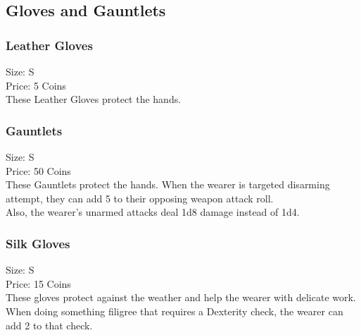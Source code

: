 \subsection{Gloves and Gauntlets}\label{subsec:gloves}

\subsubsection{Leather Gloves}\label{item:leathergloves}
Size: S\\
Price: 5 Coins\\
These Leather Gloves protect the hands.

\subsubsection{Gauntlets}\label{item:gauntlets}
Size: S\\
Price: 50 Coins\\
These Gauntlets protect the hands.
When the wearer is targeted disarming attempt, they can add 5 to their opposing weapon attack roll.\\
Also, the wearer's unarmed attacks deal 1d8 damage instead of 1d4.

\subsubsection{Silk Gloves}\label{item:silkgloves}
Size: S\\
Price: 15 Coins\\
These gloves protect against the weather and help the wearer with delicate work.
When doing something filigree that requires a Dexterity check, the wearer can add 2 to that check.